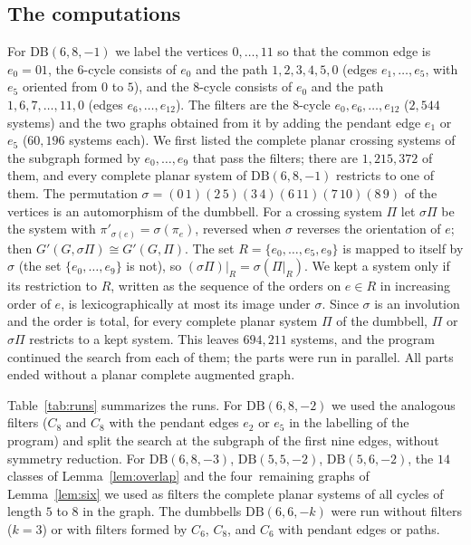\documentclass[11pt]{amsart}
\theoremstyle{definition}
\theoremstyle{remark}
\numberwithin{equation}{section}
\newcommand{\DB}{\mathrm{DB}}
\newcommand{\NSTATESALL}{1{,}215{,}372}
\newcommand{\NSTATES}{694{,}211}
\newcommand{\NCEIGHT}{2{,}544}
\newcommand{\NHONE}{60{,}196}
\begin{document}
\subsection{The computations}
For $\DB(6,8,-1)$ we label the vertices $0,\dots,11$ so that the common edge is $e_0=01$, the $6$-cycle consists of $e_0$ and the path $1,2,3,4,5,0$ (edges $e_1,\dots,e_5$, with $e_5$ oriented from $0$ to $5$), and the $8$-cycle consists of $e_0$ and the path $1,6,7,\dots,11,0$ (edges $e_6,\dots,e_{12}$). The filters are the $8$-cycle $e_0,e_6,\dots,e_{12}$ ($\NCEIGHT$ systems) and the two graphs obtained from it by adding the pendant edge $e_1$ or $e_5$ ($\NHONE$ systems each). We first listed the complete planar crossing systems of the subgraph formed by $e_0,\dots,e_9$ that pass the filters; there are $\NSTATESALL$ of them, and every complete planar system of $\DB(6,8,-1)$ restricts to one of them. The permutation $\sigma=(0\,1)(2\,5)(3\,4)(6\,11)(7\,10)(8\,9)$ of the vertices is an automorphism of the dumbbell. For a crossing system $\Pi$ let $\sigma\Pi$ be the system with $\pi'_{\sigma(e)}=\sigma(\pi_e)$, reversed when $\sigma$ reverses the orientation of $e$; then $G'(G,\sigma\Pi)\cong G'(G,\Pi)$. The set $R=\{e_0,\dots,e_5,e_9\}$ is mapped to itself by $\sigma$ (the set $\{e_0,\dots,e_9\}$ is not), so $(\sigma\Pi)|_R=\sigma(\Pi|_R)$. We kept a system only if its restriction to $R$, written as the sequence of the orders on $e\in R$ in increasing order of $e$, is lexicographically at most its image under $\sigma$. Since $\sigma$ is an involution and the order is total, for every complete planar system $\Pi$ of the dumbbell, $\Pi$ or $\sigma\Pi$ restricts to a kept system. This leaves $\NSTATES$ systems, and the program continued the search from each of them; the parts were run in parallel. All parts ended without a planar complete augmented graph.

Table~\ref{tab:runs} summarizes the runs. For $\DB(6,8,-2)$ we used the analogous filters ($C_8$ and $C_8$ with the pendant edges $e_2$ or $e_5$ in the labelling of the program) and split the search at the subgraph of the first nine edges, without symmetry reduction. For $\DB(6,8,-3)$, $\DB(5,5,-2)$, $\DB(5,6,-2)$, the $14$ classes of Lemma~\ref{lem:overlap} and the four\ remaining graphs of Lemma~\ref{lem:six} we used as filters the complete planar systems of all cycles of length $5$ to $8$ in the graph. The dumbbells $\DB(6,6,-k)$ were run without filters ($k=3$) or with filters formed by $C_6$, $C_8$, and $C_6$ with pendant edges or paths.\
\end{document}
